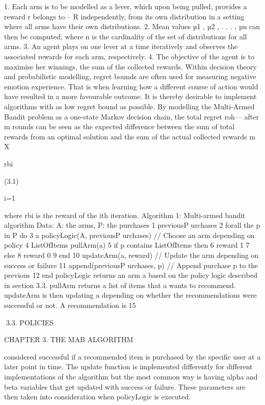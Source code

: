 1. Each arm is to be modelled as a lever, which upon being pulled, provides a reward
r belongs to -- R independently, from its own distribution in a setting where all arms have
their own distributions.
2. Mean values µ1 , µ2 , . . . , µn can then be computed, where n is the cardinality of the
set of distributions for all arms.
3. An agent plays on one lever at a time iteratively and observes the associated
rewards for each arm, respectively.
4. The objective of the agent is to maximise her winnings, the sum of the collected
rewards.
Within decision theory and probabilistic modelling, regret bounds are often used for
measuring negative emotion experience. That is when learning how a different course
of action would have resulted in a more favourable outcome. It is thereby desirable to
implement algorithms with as low regret bound as possible.
By modelling the Multi-Armed Bandit problem as a one-state Markov decision chain,
the total regret roh--- after m rounds can be seen as the expected difference between the sum
of total rewards from an optimal solution and the sum of the actual collected rewards
m
X

rbi

(3.1)

i=1

where rbi is the reward of the ith iteration.
Algorithm 1: Multi-armed bandit algorithm
Data: A: the arms, P: the purchases
1 previousP urchases  {}
2 forall the p in P do
3
a  policyLogic(A, previousP urchases) // Choose an arm depending on
policy
4
ListOfItems pullArm(a)
5
if p contains ListOfItems then
6
reward 1
7
else
8
reward 0
9
end
10
updateArm(a, reward) // Update the arm depending on success or failure
11
append(previousP urchases, p) // Append purchase p to the previous
12 end
policyLogic returns an arm a based on the policy logic described in section 3.3. pullArm
returns a list of items that a wants to recommend. updateArm is then updating a depending on whether the recommendations were successful or not. A recommendation is
15

3.3. POLICIES

CHAPTER 3. THE MAB ALGORITHM

considered successful if a recommended item is purchased by the specific user at a later
point in time. The update function is implemented differently for different implementations of the algorithm but the most common way is having alpha and beta variables that
get updated with success or failure. These parameters are then taken into consideration
when policyLogic is executed.


